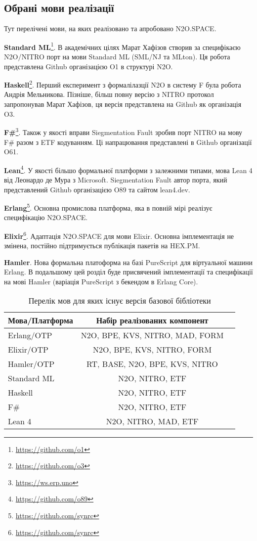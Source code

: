 \subsection*{Обрані мови реалізації}

Тут перелічені мови, на яких реалізовано та апробовано N2O.SPACE.

\textbf{Standard ML}\footnote{\url{https://github.com/o1}}. В академічних цілях Марат Хафізов створив
за специфікаєю N2O/NITRO порт на мови Standard ML (SML/NJ та MLton).
Ця робота представлена Github організацією O1 в структурі N2O.

\textbf{Haskell}\footnote{\url{https://github.com/o3}}. Перший експеримент з формалілазції N2O в систему F
була робота Андрія Мельникова. Пізніше, більш повну версію з NITRO протокол
запропонував Марат Хафізов, ця версія представлена на Github як організація O3.

\textbf{F\#}\footnote{\url{https://ws.erp.uno}}. Також у якості вправи Siegmentation Fault зробив порт NITRO
на мову F\# разом з ETF кодуванням. Ці напрацювання представлені в Github
організації O61.

\textbf{Lean}\footnote{\url{https://github.com/o89}}. У якості більшо формальної платформи з залежними типами,
мова Lean 4 від Леонардо де Мура з Microsoft. Siegmentation Fault автор порта,
який представлений Github організацією O89 та сайтом lean4.dev.

\textbf{Erlang}\footnote{\url{https://github.com/synrc}}. Основна промислова платформа, яка в повній мірі реалізує
специфікацію N2O.SPACE.

\textbf{Elixir}\footnote{\url{https://github.com/synrc}}. Адаптація N2O.SPACE для мови Elixir.
Основна імплементація не змінена, постійно підтримується публікація пакетів на HEX.PM.

\textbf{Hamler}. Нова формальна платоформа на базі PureScript для віртуальної машини Erlang.
В подальшому цей розділ буде присвячений імплементації та специфікації
на мові Hamler (варіація PureScript з бекендом в Erlang Core).

\begin{table}[h]
\begin{center}
\caption{Перелік мов для яких існує версія базової бібліотеки}
\begin{tabular}{lcc}
\hline
\textbf{Мова/Платформа} & \textbf{Набір реалізованих компонент} \\
\hline
Erlang/OTP & N2O, BPE, KVS, NITRO, MAD, FORM \\
Elixir/OTP & N2O, BPE, KVS, NITRO, FORM \\
\hline
\rowcolor{LightGray}
Hamler/OTP & RT, BASE, N2O, BPE, KVS, NITRO \\
\hline
Standard ML & N2O, NITRO, ETF \\
Haskell & N2O, NITRO, ETF \\
F\# & N2O, NITRO, ETF \\
Lean 4 & N2O, NITRO, MAD, ETF \\
\hline
\end{tabular}
\end{center}
\end{table}

